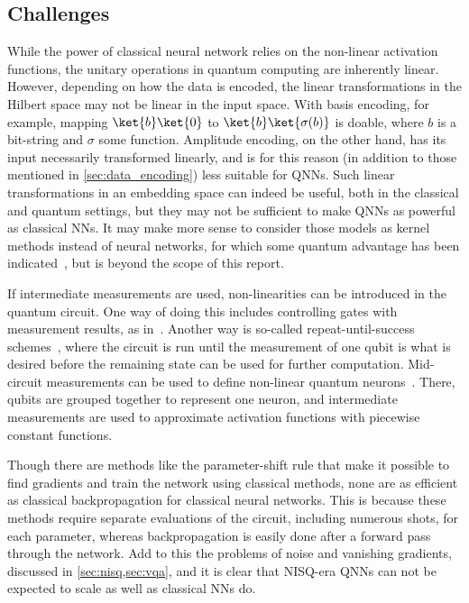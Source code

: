 \subsection{Challenges}
While the power of classical neural network relies on the non-linear activation functions, the unitary operations in quantum computing are inherently linear.
However, depending on how the data is encoded, the linear transformations in the Hilbert space may not be linear in the input space.
With basis encoding, for example, mapping $\ket{b}\ket{0}$ to $\ket{b}\ket{\sigma(b)}$ is doable, where $b$ is a bit-string and $\sigma$ some function.
Amplitude encoding, on the other hand, has its input necessarily transformed linearly, and is for this reason (in addition to those mentioned in \cref{sec:data_encoding}) less suitable for QNNs.
Such linear transformations in an embedding space can indeed be useful, both in the classical and quantum settings, but they may not be sufficient to make QNNs as powerful as classical NNs.
It may make more sense to consider those models as kernel methods instead of neural networks, for which some quantum advantage has been indicated~\autocite{schuld2019a}, but is beyond the scope of this report.

If intermediate measurements are used, non-linearities can be introduced in the quantum circuit.
One way of doing this includes controlling gates with measurement results, as in~\autocite{cong2019}.
Another way is so-called repeat-until-success schemes~\autocite{cao2017}, where the circuit is run until the measurement of one qubit is what is desired before the remaining state can be used for further computation.
Mid-circuit measurements can be used to define non-linear quantum neurons~\autocite{yan2020}.
There, qubits are grouped together to represent one neuron, and intermediate measurements are used to approximate activation functions with piecewise constant functions.

Though there are methods like the parameter-shift rule that make it possible to find gradients and train the network using classical methods, none are as efficient as classical backpropagation for classical neural networks.
This is because these methods require separate evaluations of the circuit, including numerous shots, for each parameter, whereas backpropagation is easily done after a forward pass through the network.
Add to this the problems of noise and vanishing gradients, discussed in \cref{sec:nisq,sec:vqa}, and it is clear that NISQ-era QNNs can not be expected to scale as well as classical NNs do.


